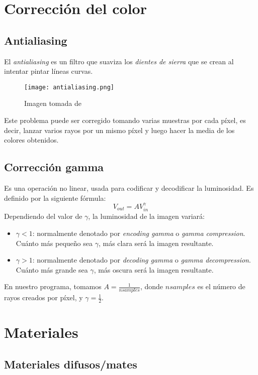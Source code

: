 \section{Corrección del color}

\subsection{Antialiasing}

El \textit{antialiasing} es un filtro que suaviza los \textit{dientes de sierra} que se crean al intentar pintar líneas curvas. 

\begin{figure}[H]
   \center
  \texttt{[image: antialiasing.png]}
  \caption{Imagen tomada de \cite{antialiasing}}
\end{figure}

Este problema puede ser corregido tomando varias muestras por cada píxel, es decir, lanzar varios rayos por un mismo píxel y luego hacer la media de los colores obtenidos.

\subsection{Corrección gamma}

Es una operación no linear, usada para codificar y decodificar la luminosidad. Es definido por la siguiente fórmula:
\[
V_{out}=AV_{in}^\gamma
\]
Dependiendo del valor de $\gamma$, la luminosidad de la imagen variará:
\begin{itemize}
\item $\gamma < 1$: normalmente denotado por \textit{encoding gamma} o \textit{gamma compression}. Cuánto más pequeño sea $\gamma$, más clara será la imagen resultante.
\item $\gamma > 1$: normalmente denotado por \textit{decoding gamma} o \textit{gamma decompression}. Cuánto más grande sea $\gamma$, más oscura será la imagen resultante.
\end{itemize}

En nuestro programa, tomamos $A=\frac{1}{nsamples}$, donde $nsamples$ es el número de rayos creados por píxel, y $\gamma=\frac{1}{2}$.

\section{Materiales}

\subsection{Materiales difusos/mates}

